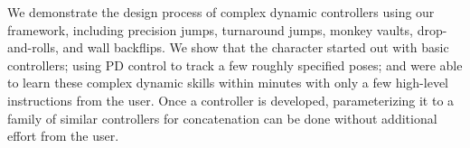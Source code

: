 We demonstrate the design process of complex dynamic controllers using
our framework, including precision jumps, turnaround jumps, monkey
vaults, drop-and-rolls, and wall backflips.  We show that the
character started out with basic controllers; using PD control to
track a few roughly specified poses; and were able to learn these
complex dynamic skills within minutes with only a few high-level
instructions from the user. Once a controller is developed,
parameterizing it to a family of similar controllers for concatenation
can be done without additional effort from the user.



